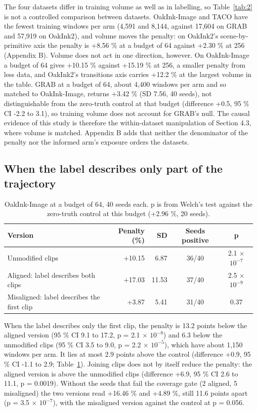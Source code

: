 \documentclass[10pt]{article}
\begin{document}
The four datasets differ in training volume as well as in labelling, so Table~\ref{tab:2} is not a controlled comparison between datasets. OakInk-Image and TACO have the fewest training windows per arm (4,591 and 8,144, against 17,604 on GRAB and 57,919 on OakInk2), and volume moves the penalty: on OakInk2's scene-by-primitive axis the penalty is +8.56 \% at a budget of 64 against +2.30 \% at 256 (Appendix B). Volume does not act in one direction, however. On OakInk-Image a budget of 64 gives +10.15 \% against +15.19 \% at 256, a smaller penalty from less data, and OakInk2's transitions axis carries +12.2 \% at the largest volume in the table. GRAB at a budget of 64, about 4,400 windows per arm and so matched to OakInk-Image, returns +3.42 \% (SD 7.56, 40 seeds), not distinguishable from the zero-truth control at that budget (difference +0.5, 95 \% CI -2.2 to 3.1), so training volume does not account for GRAB's null. The causal evidence of this study is therefore the within-dataset manipulation of Section 4.3, where volume is matched. Appendix B adds that neither the denominator of the penalty nor the informed arm's exposure orders the datasets.

\subsection{When the label describes only part of the trajectory}

\begin{table}[t]
\caption{OakInk-Image at a budget of 64, 40 seeds each. p is from Welch's test against the zero-truth control at this budget (+2.96 \%, 20 seeds).}
\label{tab:3}
\begin{center}
\small
\setlength{\tabcolsep}{3pt}
\begin{tabular}{p{}rrcc}
\toprule
\textbf{Version} & \textbf{Penalty (\%)} & \textbf{SD} & \textbf{Seeds positive} & \textbf{p} \\
\midrule
Unmodified clips & +10.15 & 6.87 & 36/40 & 2.1 $\times$ $10^{-7}$ \\
Aligned: label describes both clips & +17.03 & 11.53 & 37/40 & 2.5 $\times$ $10^{-9}$ \\
Misaligned: label describes the first clip & +3.87 & 5.41 & 31/40 & 0.37 \\
\bottomrule
\end{tabular}
\end{center}
\end{table}

When the label describes only the first clip, the penalty is 13.2 points below the aligned version (95 \% CI 9.1 to 17.2, p = 2.1 $\times$ $10^{-8}$) and 6.3 below the unmodified clips (95 \% CI 3.5 to 9.0, p = 2.2 $\times$ $10^{-5}$), which have about 1,150 windows per arm. It lies at most 2.9 points above the control (difference +0.9, 95 \% CI -1.1 to 2.9; Table~\ref{tab:3}). Joining clips does not by itself reduce the penalty: the aligned version is above the unmodified clips (difference +6.9, 95 \% CI 2.6 to 11.1, p = 0.0019). Without the seeds that fail the coverage gate (2 aligned, 5 misaligned) the two versions read +16.46 \% and +4.89 \%, still 11.6 points apart (p = 3.5 $\times$ $10^{-7}$), with the misaligned version against the control at p = 0.056.
\end{document}
